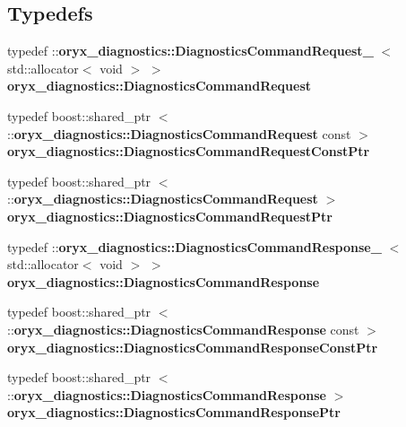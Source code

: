 \subsection*{\-Typedefs}
\begin{DoxyCompactItemize}
\item 
typedef \*
\-::{\bf oryx\-\_\-diagnostics\-::\-Diagnostics\-Command\-Request\-\_\-}\*
$<$ std\-::allocator$<$ void $>$ $>$ {\bf oryx\-\_\-diagnostics\-::\-Diagnostics\-Command\-Request}
\item 
typedef boost\-::shared\-\_\-ptr\*
$<$ \-::{\bf oryx\-\_\-diagnostics\-::\-Diagnostics\-Command\-Request} \*
const  $>$ {\bf oryx\-\_\-diagnostics\-::\-Diagnostics\-Command\-Request\-Const\-Ptr}
\item 
typedef boost\-::shared\-\_\-ptr\*
$<$ \-::{\bf oryx\-\_\-diagnostics\-::\-Diagnostics\-Command\-Request} $>$ {\bf oryx\-\_\-diagnostics\-::\-Diagnostics\-Command\-Request\-Ptr}
\item 
typedef \*
\-::{\bf oryx\-\_\-diagnostics\-::\-Diagnostics\-Command\-Response\-\_\-}\*
$<$ std\-::allocator$<$ void $>$ $>$ {\bf oryx\-\_\-diagnostics\-::\-Diagnostics\-Command\-Response}
\item 
typedef boost\-::shared\-\_\-ptr\*
$<$ \-::{\bf oryx\-\_\-diagnostics\-::\-Diagnostics\-Command\-Response} \*
const  $>$ {\bf oryx\-\_\-diagnostics\-::\-Diagnostics\-Command\-Response\-Const\-Ptr}
\item 
typedef boost\-::shared\-\_\-ptr\*
$<$ \-::{\bf oryx\-\_\-diagnostics\-::\-Diagnostics\-Command\-Response} $>$ {\bf oryx\-\_\-diagnostics\-::\-Diagnostics\-Command\-Response\-Ptr}
\end{DoxyCompactItemize}

